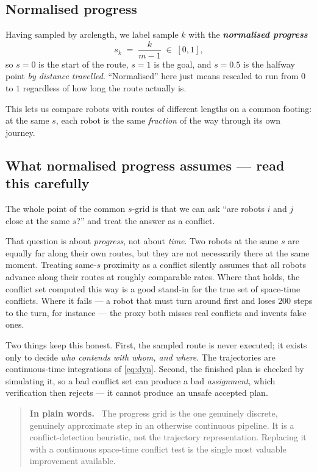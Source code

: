 \documentclass[11pt,a4paper]{article}
\newcommand{\defn}[1]{\textbf{\textit{#1}}}
\newenvironment{keypoint}
  {\begin{quote}\small\noindent\textbf{In plain words.}\ }
  {\end{quote}}
\begin{document}
\subsection{Normalised progress}

Having sampled by arclength, we label sample $k$ with the \defn{normalised progress}
\[
s_k \;=\; \frac{k}{m-1} \;\in\; [0, 1],
\]
so $s = 0$ is the start of the route, $s = 1$ is the goal, and $s = 0.5$ is the halfway
point \emph{by distance travelled}. ``Normalised'' here just means rescaled to run from $0$
to $1$ regardless of how long the route actually is.

This lets us compare robots with routes of different lengths on a common footing: at the
same $s$, each robot is the same \emph{fraction} of the way through its own journey.

\subsection{What normalised progress assumes --- read this carefully}

The whole point of the common $s$-grid is that we can ask ``are robots $i$ and $j$ close at
the same $s$?'' and treat the answer as a conflict.

That question is about \emph{progress}, not about \emph{time}. Two robots at the same $s$
are equally far along their own routes, but they are not necessarily there at the same
moment. Treating same-$s$ proximity as a conflict silently assumes that all robots advance
along their routes at roughly comparable rates. Where that holds, the conflict set computed
this way is a good stand-in for the true set of space-time conflicts. Where it fails --- a
robot that must turn around first and loses $200$ steps to the turn, for instance --- the
proxy both misses real conflicts and invents false ones.

Two things keep this honest. First, the sampled route is never executed; it exists only to
decide \emph{who contends with whom, and where}. The trajectories are continuous-time
integrations of \eqref{eq:dyn}. Second, the finished plan is checked by simulating it, so a
bad conflict set can produce a bad \emph{assignment}, which verification then rejects --- it
cannot produce an unsafe accepted plan.

\begin{keypoint}
The progress grid is the one genuinely discrete, genuinely approximate step in an otherwise
continuous pipeline. It is a conflict-detection heuristic, not the trajectory
representation. Replacing it with a continuous space-time conflict test is the single most
valuable improvement available.
\end{keypoint}
\end{document}
